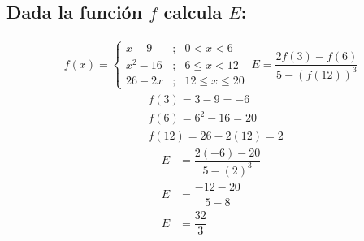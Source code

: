 \documentclass[10pt, a4paper]{article}
\begin{document}
\begin{multicols*}{2}
  \subsection{\small Dada la función $f$ calcula $E$:}
  \vspace{-0.7cm}
  \begin{align*}
    f(x)=\left\{
      \begin{array}{rcl}
        x-9 &; &0<x<6\\
        x^2-16&; &6\leq x<12\\
        26-2x &; &12 \leq x \leq 20
      \end{array}
      \right.\ E= \dfrac{2f\left(3\right)-f\left(6\right)}{5-\left(f\left(12\right)\right)^3}
  \end{align*}
  \vspace{-0.7cm}
  \begin{align*}
    &f\left(3\right) = 3-9 = -6\\
    &f\left(6\right) = 6^2-16 = 20\\
    &f\left(12\right) = 26-2\left(12\right) = 2
  \end{align*}
  \vspace{-0.7cm}
  \begin{align*}
    E &= \dfrac{2\left(-6\right)-20}{5-\left(2\right)^3}\\
    E &= \dfrac{-12-20}{5-8}\\
    E &= \dfrac{32}{3}    
  \end{align*}
  \vspace{-0.7cm}

\end{multicols*}
\end{document}
